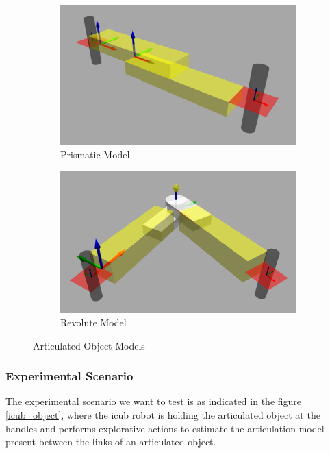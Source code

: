 \documentclass[12pt,a4paper]{report}
\begin{document}
\begin{figure}[H]
	\begin{subfigure}[b]{0.5\textwidth}
		\centering
		\includegraphics[scale=0.15]{figures/1p_2link.png}
		\caption{Prismatic Model}
		\label{pmodel}
	\end{subfigure}
	\begin{subfigure}[b]{0.5\textwidth}
		\centering
		\includegraphics[scale=0.16]{figures/1r_2link.png}
		\caption{Revolute Model}
		\label{rmodel}
	\end{subfigure}
	\caption{Articulated Object Models}
	\label{objects}
\end{figure}

\subsubsection{Experimental Scenario}
The experimental scenario we want to test is as indicated in the figure \ref{icub_object}, where the icub robot is holding the articulated object at the handles and performs explorative actions to estimate the
articulation model present between the links of an articulated object.
\end{document}
